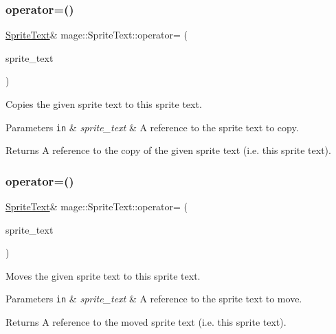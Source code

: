 \subsubsection{\texorpdfstring{operator=()}{operator=()}\hspace{0.1cm}{\footnotesize\ttfamily [1/2]}}
{\footnotesize\ttfamily \hyperlink{classmage_1_1_sprite_text}{Sprite\+Text}\& mage\+::\+Sprite\+Text\+::operator= (\begin{DoxyParamCaption}\item[{const \hyperlink{classmage_1_1_sprite_text}{Sprite\+Text} \&}]{sprite\+\_\+text }\end{DoxyParamCaption})\hspace{0.3cm}{\ttfamily [delete]}}

Copies the given sprite text to this sprite text.


\begin{DoxyParams}[1]{Parameters}
\mbox{\tt in}  & {\em sprite\+\_\+text} & A reference to the sprite text to copy. \\
\hline
\end{DoxyParams}
\begin{DoxyReturn}{Returns}
A reference to the copy of the given sprite text (i.\+e. this sprite text). 
\end{DoxyReturn}
\hypertarget{classmage_1_1_sprite_text_a7e2e165d7682d9cc623b7c9725f76920}{}\label{classmage_1_1_sprite_text_a7e2e165d7682d9cc623b7c9725f76920} 
\subsubsection{\texorpdfstring{operator=()}{operator=()}\hspace{0.1cm}{\footnotesize\ttfamily [2/2]}}
{\footnotesize\ttfamily \hyperlink{classmage_1_1_sprite_text}{Sprite\+Text}\& mage\+::\+Sprite\+Text\+::operator= (\begin{DoxyParamCaption}\item[{\hyperlink{classmage_1_1_sprite_text}{Sprite\+Text} \&\&}]{sprite\+\_\+text }\end{DoxyParamCaption})\hspace{0.3cm}{\ttfamily [delete]}}

Moves the given sprite text to this sprite text.


\begin{DoxyParams}[1]{Parameters}
\mbox{\tt in}  & {\em sprite\+\_\+text} & A reference to the sprite text to move. \\
\hline
\end{DoxyParams}
\begin{DoxyReturn}{Returns}
A reference to the moved sprite text (i.\+e. this sprite text). 
\end{DoxyReturn}
\hypertarget{classmage_1_1_sprite_text_a99402a3ca60e50f606e6cce7bc8b2828}{}\label{classmage_1_1_sprite_text_a99402a3ca60e50f606e6cce7bc8b2828} 
